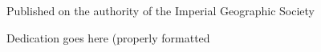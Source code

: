
\frontmatter

\title{\headerfont\ctitle}
\date{}
\maketitle
\newpage
\newpage

\date{\headerfont\cpublished}
\author{\headerfont\cauthor}
\maketitle
\newpage

Published on the authority of the Imperial Geographic Society
\newpage

Dedication goes here (properly formatted
\newpage

\tableofcontents